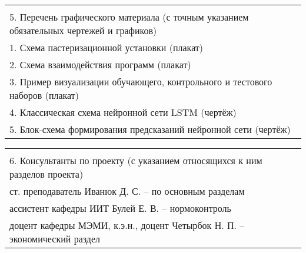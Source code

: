 \documentclass[12pt, А4, twoside]{article}
\begin{document}
\begin{FlushLeft}
    \begin{tabular}{p{17.25cm}} 
        \vspace{1pt} \hline  \\
        \textsf{5. Перечень графического материала (с точным указанием обязательных чертежей и графиков)} \vspace{1pt} \hline \\
        \hspace{0.3cm} \textsf{1. Схема пастеризационной установки (плакат)} \vspace{1pt} \hline  \\
        \hspace{0.3cm} \textsf{2. Схема взаимодействия программ (плакат)} \vspace{1pt} \hline  \\
        \hspace{0.3cm} \textsf{3. Пример визуализации обучающего, контрольного и тестового наборов (плакат)} \vspace{1pt} \hline  \\
        \hspace{0.3cm} \textsf{4. Классическая схема нейронной сети LSTM (чертёж)} \vspace{1pt} \hline  \\
        \hspace{0.3cm} \textsf{5. Блок-схема формирования предсказаний нейронной сети (чертёж)} \vspace{1pt} \hline  \\
    \end{tabular} 

    \begin{tabular}{p{17.25cm}} 
        \vspace{1pt} \hline  \\
        \textsf{6. Консультанты по проекту (с указанием относящихся к ним разделов проекта)} \vspace{1pt} \hline \\
        \hspace{0.3cm} \textsf{ст. преподаватель Иванюк Д. С. {--} по основным разделам} \vspace{1pt} \hline \\
        \hspace{0.3cm} \textsf{ассистент кафедры ИИТ Булей Е. В. {--} нормоконтроль} \vspace{1pt} \hline \\
        \hspace{0.3cm} \textsf{доцент кафедры МЭМИ, к.э.н., доцент Четырбок Н. П. {--} экономический раздел} \vspace{1pt} \hline \\
    \end{tabular}   


\end{FlushLeft}
\end{document}
